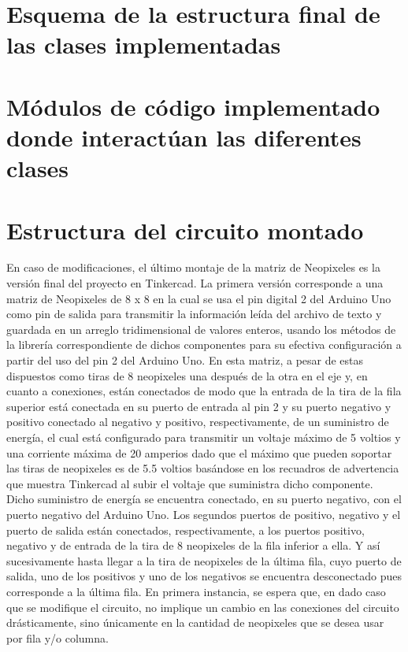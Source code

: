 \documentclass{article}
\begin{document}
\section{Esquema de la estructura final de las clases implementadas}
\section{Módulos de código implementado donde interactúan las diferentes clases}
\section{Estructura del circuito montado}
En caso de modificaciones, el último montaje de la matriz de Neopixeles es la versión final del proyecto en Tinkercad. La primera versión corresponde a una matriz de Neopixeles de 8 x 8 en la cual se usa el pin digital 2 del Arduino Uno como pin de salida para transmitir la información leída del archivo de texto y guardada en un arreglo tridimensional de valores enteros, usando los métodos de la librería correspondiente de dichos componentes para su efectiva configuración a partir del uso del pin 2 del Arduino Uno. En esta matriz, a pesar de estas dispuestos como tiras de 8 neopixeles una después de la otra en el eje y, en cuanto a conexiones, están conectados de modo que la entrada de la tira de la fila superior está conectada en su puerto de entrada al pin 2 y su puerto negativo y positivo conectado al negativo y positivo, respectivamente, de un suministro de energía, el cual está configurado para transmitir un voltaje máximo de 5 voltios y una corriente máxima de 20 amperios dado que el máximo que pueden soportar las tiras de neopixeles es de 5.5 voltios basándose en los recuadros de advertencia que muestra Tinkercad al subir el voltaje que suministra dicho componente. Dicho suministro de energía se encuentra conectado, en su puerto negativo, con el puerto negativo del Arduino Uno. Los segundos puertos de positivo, negativo y el puerto de salida están conectados, respectivamente, a los puertos positivo, negativo y de entrada de la tira de 8 neopixeles de la fila inferior a ella. Y así sucesivamente hasta llegar a la tira de neopixeles de la última fila, cuyo puerto de salida, uno de los positivos y uno de los negativos se encuentra desconectado pues corresponde a la última fila. En primera instancia, se espera que, en dado caso que se modifique el circuito, no implique un cambio en las conexiones del circuito drásticamente, sino únicamente en la cantidad de neopixeles que se desea usar por fila y/o columna.
\end{document}

